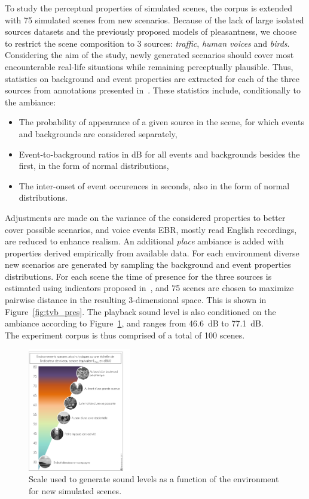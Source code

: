 \documentclass[11pt,a4paper]{article}
\begin{document}
To study the perceptual properties of simulated scenes, the corpus is extended with 75 simulated scenes from new scenarios. Because of the lack of large isolated sources datasets and the previously proposed models of pleasantness, we choose to restrict the scene composition to 3 sources: \textit{traffic}, \textit{human voices} and \textit{birds}. Considering the aim of the study, newly generated scenarios should cover most encounterable real-life situations while remaining perceptually plausible. Thus, statistics on background and event properties are extracted for each of the three sources from annotations presented in~\cite{jrg}. These statistics include, conditionally to the ambiance:
\begin{itemize}
\item The probability of appearance of a given source in the scene, for which events and backgrounds are considered separately,
\item Event-to-background ratios in dB for all events and backgrounds besides the first, in the form of normal distributions,
\item The inter-onset of event occurences in seconds, also in the form of normal distributions.
\end{itemize}
Adjustments are made on the variance of the considered properties to better cover possible scenarios, and voice events EBR, mostly read English recordings, are reduced to enhance realism. An additional \textit{place} ambiance is added with properties derived empirically from available data. For each environment diverse new scenarios are generated by sampling the background and event properties distributions. For each scene the time of presence for the three sources is estimated using indicators proposed in~\cite{gontier}, and 75 scenes are chosen to maximize pairwise distance in the resulting 3-dimensional space. This is shown in Figure~\ref{fig:tvb_pres}. The playback sound level is also conditioned on the ambiance according to Figure~\ref{fig:amb_levels}, and ranges from 46.6~dB to 77.1~dB.\\

The experiment corpus is thus comprised of a total of 100 scenes.



\begin{figure}[!h]
    \centering
    \includegraphics[width=0.4\textwidth]{figures/leqa.png}
    \caption{Scale used to generate sound levels as a function of the environment for new simulated scenes.}\label{fig:amb_levels}
\end{figure}
\end{document}
